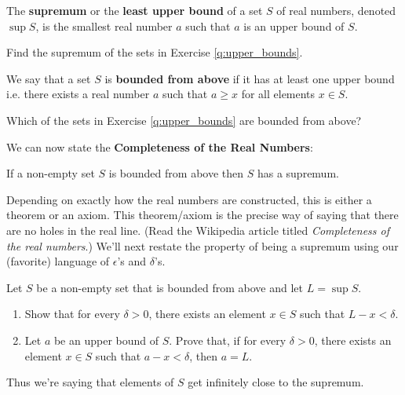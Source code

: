 \begin{definition}
	The {\bf supremum} or the {\bf least upper bound} of a set $S$ of real numbers, denoted $\sup S$, is the smallest real number $a$ such that $a$ is an upper bound of $S$.
\end{definition}

\begin{exercise}
	Find the supremum of the sets in Exercise \ref{q:upper_bounds}.
\end{exercise}


\begin{definition}
	We say that a set $S$ is {\bf bounded from above} if it has at least one upper bound i.e. there exists a real number $a$ such that $a \ge x$ for all elements $x \in S$.
\end{definition}

\begin{exercise}
	Which of the sets in Exercise \ref{q:upper_bounds} are bounded from above?\\
\end{exercise}

We can now state the {\bf Completeness of the Real Numbers}:
\begin{theorem}
	If a non-empty set $S$ is bounded from above then $S$ has a supremum.
\end{theorem}

Depending on exactly how the real numbers are constructed, this is either a theorem or an axiom. This theorem/axiom is the precise way of saying that there are no holes in the real line. (Read the Wikipedia article titled {\it Completeness of the real numbers}.) We'll next restate the property of being a supremum using our (favorite) language of $\epsilon$'s and $\delta$'s.


\begin{exercise}
	\label{q:supremum_closeness}
	Let $S$ be a non-empty set that is bounded from above and let $L = \sup S$.
	\begin{enumerate}
		\item Show that for every $ \delta > 0 $, there exists an element $x \in S$ such that $L - x < \delta$. 
		\item Let $a$ be an upper bound of $S$. Prove that, if for every $ \delta > 0 $, there exists an element $x \in S$ such that $a - x < \delta$, then $a = L$. 
	\end{enumerate}
\end{exercise}
Thus we're saying that elements of $S$ get infinitely close to the supremum.



